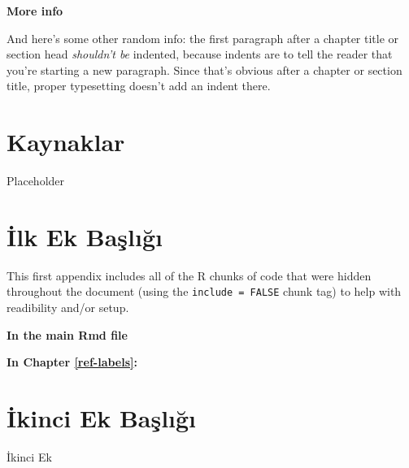 \documentclass[12pt,twoside]{deuthesis}
\begin{document}
\textbf{More info}

And here's some other random info: the first paragraph after a chapter title or section head \emph{shouldn't be} indented, because indents are to tell the reader that you're starting a new paragraph. Since that's obvious after a chapter or section title, proper typesetting doesn't add an indent there.

\hypertarget{kaynaklar}{%
\chapter*{Kaynaklar}\label{kaynaklar}}

Placeholder

\appendix

\hypertarget{ilk-ek-baux15flux131ux11fux131}{%
\chapter{İlk Ek Başlığı}\label{ilk-ek-baux15flux131ux11fux131}}

This first appendix includes all of the R chunks of code that were hidden throughout the document (using the \texttt{include\ =\ FALSE} chunk tag) to help with readibility and/or setup.

\textbf{In the main Rmd file}

\textbf{In Chapter \ref{ref-labels}:}

\hypertarget{ikinci-ek-baux15flux131ux11fux131}{%
\chapter{İkinci Ek Başlığı}\label{ikinci-ek-baux15flux131ux11fux131}}

İkinci Ek
\end{document}
